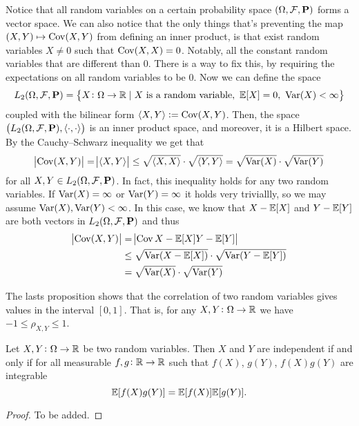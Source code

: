 \documentclass[11pt,a4paper]{article}
\begin{document}
  Notice that all random variables on a certain probability space
  $(\Omega, \mathcal F, \mathbf{P})$ forms a vector space. We can also
  notice that the only things that's preventing the map 
  $(X,Y) \mapsto \operatorname{Cov}(X,Y)$ from defining an inner product, is that
  exist random variables $X \neq 0$ such that $\operatorname{Cov}(X,X) = 0$.
  Notably, all the constant random variables that are different than
  $0$. There is a way to fix this, by requiring the expectations on
  all random variables to be $0$. Now we can define the space
  \[
    L_2(\Omega, \mathcal F, \mathbf{P}) =
    \set{X \colon \Omega \to \mathbb{R}\mid
    X\text{ is a random variable},\ \mathbb{E}[X] = 0,\ \operatorname{Var}(X) < \infty}
  \]
  coupled with the bilinear form $\langle X, Y \rangle := \operatorname{Cov}(X,Y)$.
  Then, the space 
  $\left(L_2(\Omega, \mathcal F, \mathbf{P}), \langle \cdot, \cdot \rangle\right)$
  is an inner product space, and moreover, it is a Hilbert space.
  By the Cauchy--Schwarz inequality we get that
  \[
    \abs{\operatorname{Cov}(X,Y)} =
    \abs{\langle X, Y \rangle} \le
    \sqrt{\langle X, X \rangle} \cdot \sqrt{\langle Y, Y \rangle} =
    \sqrt{\operatorname{Var}(X)} \cdot \sqrt{\operatorname{Var}(Y)}
  \]
  for all $X,Y \in L_2(\Omega, \mathcal F, \mathbf{P})$.
  In fact, this inequality holds for any two random variables.
  If $\operatorname{Var}(X) = \infty$ or $\operatorname{Var}(Y) = \infty$ it holds very triviallly,
  so we may assume $\operatorname{Var}(X),\operatorname{Var}(Y) < \infty$.
  In this case, we know that $X - \mathbb{E}[X]$ and $Y - \mathbb{E}[Y]$ are both
  vectors in $L_2(\Omega, \mathcal F, \mathbf{P})$ and thus
  \begin{align*}
    \abs{\operatorname{Cov}(X,Y)} &= \abs{\operatorname{Cov}{X - \mathbb{E}[X]}{Y - \mathbb{E}[Y]}} \\
    &\le \sqrt{\operatorname{Var}(X - \mathbb{E}[X])} \cdot \sqrt{\operatorname{Var}(Y - \mathbb{E}[Y])} \\
    &= \sqrt{\operatorname{Var}(X)} \cdot \sqrt{\operatorname{Var}(Y)}
  \end{align*}

  \begin{remark}
    The lasts proposition shows that the correlation of two random variables
    gives values in the interval $[0,1]$. 
    That is, for any $X,Y \colon \Omega \to \mathbb{R}$ we have 
    $-1 \le \rho_{X,Y} \le 1$.
  \end{remark}
  
  \begin{proposition}
    Let $X,Y \colon \Omega \to \mathbb{R}$ be two random variables.
    Then $X$ and $Y$ are independent if and only if for all measurable
    $f,g \colon \mathbb{R} \to \mathbb{R}$ such that $f(X)$, $g(Y)$, $f(X)g(Y)$ are
    integrable
    \[
      \mathbb{E}[f(X)g(Y)] = \mathbb{E}[f(X)] \mathbb{E}[g(Y)].
    \]
  \end{proposition}
  \begin{proof}
    To be added.
  \end{proof}
  
\end{document}
